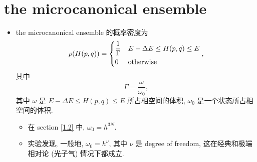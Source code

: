 
\section{the microcanonical ensemble}
\begin{itemize}
	\item the microcanonical ensemble 的概率密度为
	\begin{equation}
		\rho(H(p, q)) = \begin{dcases}
			\frac{1}{\Gamma} & E - \Delta E \leq H(p, q) \leq E \\
			0 & \text{otherwise}
		\end{dcases},
	\end{equation}
	其中
	\begin{equation}
		\Gamma = \frac{\omega}{\omega_0},
	\end{equation}
	其中 $\omega$ 是 $E - \Delta E \leq H(p, q) \leq E$ 所占相空间的体积, $\omega_0$ 是一个状态所占相空间的体积.
	\begin{itemize}
		\item 在 section \ref{1.2} 中, $\omega_0 = h^{3 N}$.
		
		\item 实验发现, 一般地, $\omega_0 = h^\nu$, 其中 $\nu$ 是 degree of freedom, 这在经典和极端相对论 (光子气) 情况下都成立.
	\end{itemize}
\end{itemize}
